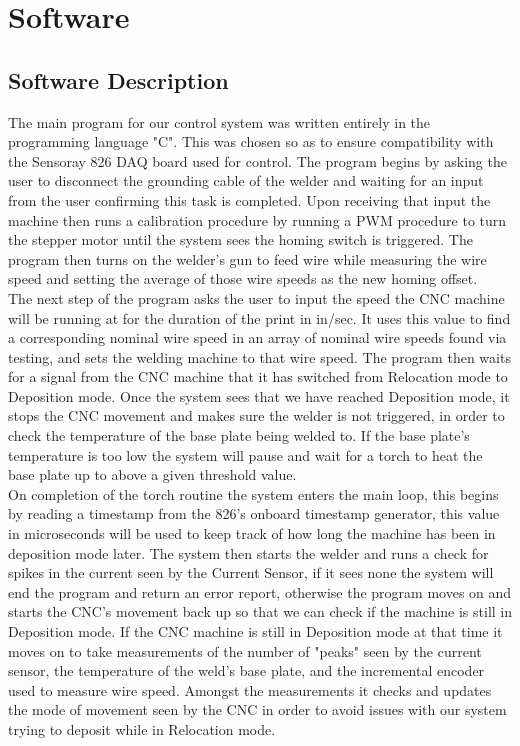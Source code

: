 \documentclass[12pt]{article}
\newlength\tindent
\renewcommand{\indent}{\hspace*{\tindent}}
\begin{document}
\clearpage



\section{Software}

\subsection{Software Description}

\indent The main program for our control system was written entirely in  the programming language "C". This was chosen so as to ensure compatibility with the Sensoray 826 DAQ board used for control. The program begins by asking the user to disconnect the grounding cable of the welder and waiting for an input from the user confirming this task is completed. Upon receiving that input the machine then runs a calibration procedure by running a PWM procedure to turn the stepper motor until the system sees the homing switch is triggered. The program then turns on the welder's gun to feed wire while measuring  the wire speed and setting the average of those wire speeds as the new homing offset. \\
\indent	The next step of the program asks the user to input the speed the CNC machine will be running at for the duration of the print in in/sec. It uses this value to find a corresponding nominal wire speed in an array of nominal wire speeds found via testing, and sets the welding machine to that wire speed. The program then waits for a signal from the CNC machine that it has switched from Relocation mode to Deposition mode. Once the system sees that we have reached Deposition mode, it stops the CNC movement and makes sure the welder is not triggered, in order to check the temperature of the base plate being welded to. If the base plate's temperature is too low the system will pause and wait for a torch to heat the base plate up to above a given threshold value. \\
\indent	On completion of the torch routine the system enters the main loop, this begins by reading a timestamp from the 826's onboard timestamp generator, this value in microseconds will be used to keep track of how long the machine has been in deposition mode later. The system then starts the welder and runs a check for spikes in the current seen by the Current Sensor, if it sees none the system will end the program and return an error report, otherwise the program moves on and starts the CNC's movement back up so that we can check if the machine is still in Deposition mode. If the CNC machine is still in Deposition mode at that time it moves on to take measurements of the number of "peaks" seen by the current sensor, the temperature of the weld's base plate, and  the incremental encoder used to measure wire speed. Amongst the measurements it checks and updates the mode of movement seen by the CNC in order to avoid issues with our system trying to deposit while in Relocation mode. \\
\end{document}
